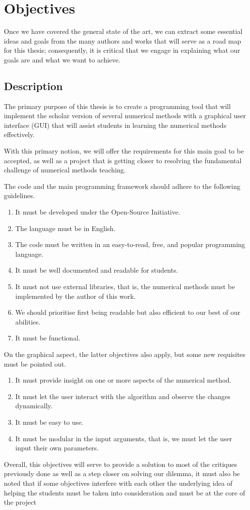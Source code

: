 \chapter{Objectives}
Once we have covered the general state of the art, we can extract some essential ideas and goals from the many authors and works that will serve as a road map for this thesis; consequently, it is critical that we engage in explaining what our goals are and what we want to achieve.

\section{Description}
The primary purpose of this thesis is to create a programming tool that will implement the scholar version of several numerical methods with a graphical user interface (GUI) that will assist students in learning the numerical methods effectively.

With this primary notion, we will offer the requirements for this main goal to be accepted, as well as a project that is getting closer to resolving the fundamental challenge of numerical methods teaching.

The code and the main programming framework should adhere to the following guidelines.
\begin{enumerate}
    \item It must be developed under the Open-Source Initiative.
    \item The language must be in English.
    \item The code must be written in an easy-to-read, free, and popular programming language.
    \item It must be well documented and readable for students.
    \item It must not use external libraries, that is, the numerical methods must be implemented by the author of this work.
    \item We should prioritise first being readable but also efficient to our best of our abilities.
    \item It must be functional.
\end{enumerate}

On the graphical aspect, the latter objectives also apply, but some new requisites must be pointed out.
\begin{enumerate}
    \item It must provide insight on one or more aspects of the numerical method.
    \item It must let the user interact with the algorithm and observe the changes dynamically.
    \item It must be easy to use.
    \item It must be modular in the input arguments, that is, we must let the user input their own parameters.
\end{enumerate}

Overall, this objectives will serve to provide a solution to most of the critiques previously done as well as a step closer on solving our dilemma, it must also be noted that if some objectives interfere with each other the underlying idea of helping the students must be taken into consideration and must be at the core of the project
